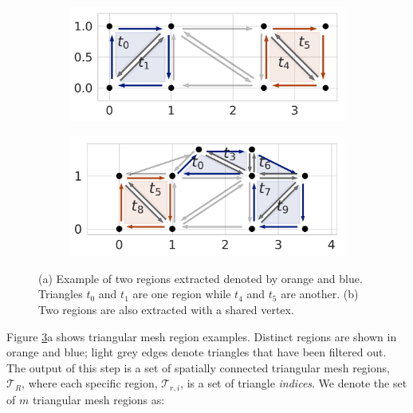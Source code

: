 \begin{figure}[ht]
    \centering
  \begin{subfigure}{.3\linewidth}
    \centering
    \includegraphics[width=0.99\linewidth]{chapter_2_polylidar/imgs/plane_extraction_a-min.pdf}
    \caption{}
    \label{fig:ch2_plane_extraction_a}
  \end{subfigure}
  \begin{subfigure}{.3\linewidth}
    \centering
    \includegraphics[width=.99\linewidth]{chapter_2_polylidar/imgs/plane_extraction_b-min.pdf}
    \caption{}
    \label{fig:ch2_plane_extraction_b}
  \end{subfigure}
  \caption[Region growing example from triangulation]{(a) Example of two regions extracted denoted by orange and blue. Triangles $t_0$ and $t_1$ are one region while $t_4$ and $t_5$ are another. (b) Two regions are also extracted with a shared vertex.}
  \label{fig:ch2_plane_extraction} 
\end{figure}


 Figure \ref{fig:ch2_plane_extraction}a shows triangular mesh region examples. Distinct regions are shown in orange and blue; light grey edges denote triangles that have been filtered out.  
 The output of this step is a set of spatially connected triangular mesh regions, $\mathcal{T}_R$, where each specific region, $\mathcal{T}_{r,i}$, is a set of triangle \emph{indices}. We denote the set of $m$ triangular mesh regions as:

